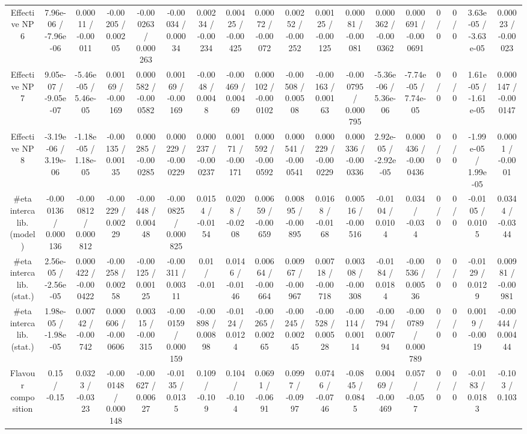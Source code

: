 \documentclass[10pt]{article}
\begin{document}
\begin{table}[htbp]
\begin{center}
\begin{tabular}{|c|c|c|c|c|c|c|c|c|c|c|c|c|c|c|c|c|c|}
  Effective NP 6 & 7.96e-06 / -7.96e-06 & 0.00011 / -0.00011 & -0.00205 / 0.00205 & -0.000263 / 0.000263 & -0.00034 / 0.00034 & 0.00234 / -0.00234 & 0.00425 / -0.00425 & 0.00072 / -0.00072 & 0.00252 / -0.00252 & 0.00125 / -0.00125 & 0.00081 / -0.00081 & 0.000362 / -0.000362 & 0.000691 / -0.000691 & 0 / 0 & 0 / 0 & 3.63e-05 / -3.63e-05 & 0.00023 / -0.00023 \\ 
  Effective NP 7 & 9.05e-07 / -9.05e-07 & -5.46e-05 / 5.46e-05 & 0.00169 / -0.00169 & 0.000582 / -0.000582 & 0.00169 / -0.00169 & -0.0048 / 0.0048 & -0.00469 / 0.00469 & 0.000102 / -0.000102 & -0.00508 / 0.00508 & -0.00163 / 0.00163 & -0.000795 / 0.000795 & -5.36e-06 / 5.36e-06 & -7.74e-05 / 7.74e-05 & 0 / 0 & 0 / 0 & 1.61e-05 / -1.61e-05 & 0.000147 / -0.000147 \\ 
  Effective NP 8 & -3.19e-06 / 3.19e-06 & -1.18e-05 / 1.18e-05 & -0.00135 / 0.00135 & 0.000285 / -0.000285 & 0.000229 / -0.000229 & 0.000237 / -0.000237 & 0.00171 / -0.00171 & 0.000592 / -0.000592 & 0.000541 / -0.000541 & 0.000229 / -0.000229 & 0.000336 / -0.000336 & 2.92e-05 / -2.92e-05 & 0.000436 / -0.000436 & 0 / 0 & 0 / 0 & -1.99e-05 / 1.99e-05 & 0.0001 / -0.0001 \\ 
  #eta intercalib. (model) & -0.000136 / 0.000136 & -0.000812 / 0.000812 & -0.00229 / 0.00229 & -0.00448 / 0.00448 & -0.000825 / 0.000825 & 0.0154 / -0.0154 & 0.0208 / -0.0208 & 0.00659 / -0.00659 & 0.00895 / -0.00895 & 0.0168 / -0.0168 & 0.00516 / -0.00516 & -0.0104 / 0.0104 & 0.034 / -0.034 & 0 / 0 & 0 / 0 & -0.0105 / 0.0105 & 0.0344 / -0.0344 \\ 
  #eta intercalib. (stat.) & 2.56e-05 / -2.56e-05 & 0.000422 / -0.000422 & -0.00258 / 0.00258 & -0.00125 / 0.00125 & -0.00311 / 0.00311 & 0.01 / -0.01 & 0.0146 / -0.0146 & 0.00664 / -0.00664 & 0.00967 / -0.00967 & 0.00718 / -0.00718 & 0.00308 / -0.00308 & -0.0184 / 0.0184 & -0.00536 / 0.00536 & 0 / 0 & 0 / 0 & -0.0129 / 0.0129 & 0.00981 / -0.00981 \\ 
  #eta intercalib. (stat.) & 1.98e-05 / -1.98e-05 & 0.00742 / -0.00742 & 0.000606 / -0.000606 & 0.00315 / -0.00315 & -0.000159 / 0.000159 & -0.00898 / 0.00898 & -0.0124 / 0.0124 & -0.00265 / 0.00265 & -0.00245 / 0.00245 & -0.00528 / 0.00528 & -0.00114 / 0.00114 & -0.00794 / 0.00794 & -0.000789 / 0.000789 & 0 / 0 & 0 / 0 & 0.0019 / -0.0019 & -0.00444 / 0.00444 \\ 
  Flavour composition & 0.15 / -0.15 & 0.0323 / -0.0323 & -0.000148 / 0.000148 & -0.00627 / 0.00627 & -0.0135 / 0.0135 & 0.109 / -0.109 & 0.104 / -0.104 & 0.0691 / -0.0691 & 0.0997 / -0.0997 & 0.0746 / -0.0746 & -0.0845 / 0.0845 & 0.00469 / -0.00469 & 0.057 / -0.057 & 0 / 0 & 0 / 0 & -0.0183 / 0.0183 & -0.103 / 0.103 \\ 

\end{tabular}
\end{center}
\end{table}
\end{document}

